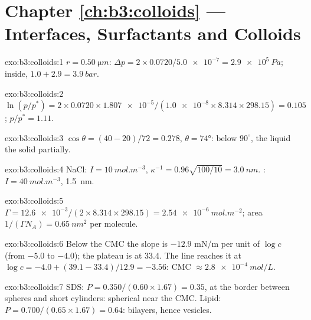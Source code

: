 \section*{Chapter \ref{ch:b3:colloids} --- Interfaces, Surfactants and Colloids}

\begin{solution}{exo:b3:colloids:1}
$r = \qty{0.50}{\micro m}$: $\Delta p = 2 \times 0.0720/\num{5.0e-7} = \qty{2.9e5}{Pa}$; inside, $1.0 + 2.9 = \qty{3.9}{bar}$.
\end{solution}

\begin{solution}{exo:b3:colloids:2}
$\ln(p/p^*) = 2 \times 0.0720 \times \num{1.807e-5}/(\num{1.0e-8} \times 8.314 \times 298.15) = 0.105$; $p/p^* = 1.11$.
\end{solution}

\begin{solution}{exo:b3:colloids:3}
$\cos\theta = (40 - 20)/72 = 0.278$, $\theta = \ang{74}$: below $90^\circ$, the liquid  the solid
partially.
\end{solution}

\begin{solution}{exo:b3:colloids:4}
NaCl: $I = \qty{10}{mol.m^{-3}}$, $\kappa^{-1} = 0.96\sqrt{100/10} = \qty{3.0}{nm}$. : $I = \qty{40}{mol.m^{-3}}$, \qty{1.5}{nm}.
\end{solution}

\begin{solution}{exo:b3:colloids:5}
$\Gamma = \num{12.6e-3}/(2 \times 8.314 \times 298.15) = \qty{2.54e-6}{mol.m^{-2}}$; area $1/(\Gamma N_A) =
\qty{0.65}{nm^2}$ per molecule.
\end{solution}

\begin{solution}{exo:b3:colloids:6}
Below the CMC the slope is $-12.9$ \unit{mN/m} per unit of $\log c$ (from $-5.0$ to $-4.0$); the
plateau is at 33.4. The line reaches it at $\log c = -4.0 + (39.1 - 33.4)/12.9 = -3.56$: CMC
$\approx \qty{2.8e-4}{mol/L}$.
\end{solution}

\begin{solution}{exo:b3:colloids:7}
SDS: $P = 0.350/(0.60 \times 1.67) = 0.35$, at the border between spheres and short
cylinders: spherical  near the CMC. Lipid: $P = 0.700/(0.65 \times 1.67) = 0.64$:
bilayers, hence vesicles.
\end{solution}

